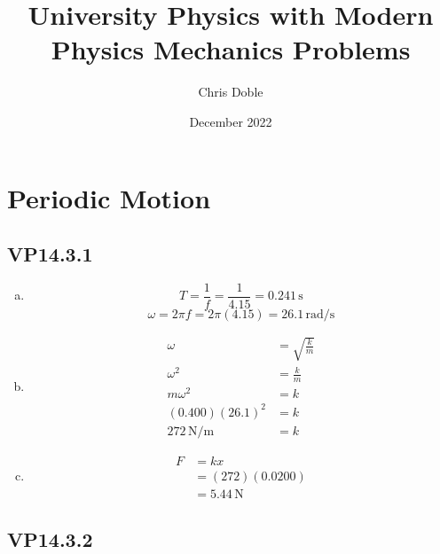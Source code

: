 \documentclass{article}
\title{University Physics with Modern Physics Mechanics Problems}
\author{Chris Doble}
\date{December 2022}
\begin{document}
\maketitle

\tableofcontents

\setcounter{section}{13}
\section{Periodic Motion}

\subsection{VP14.3.1}

\begin{enumerate}[a)]
  \item
        \[T = \frac{1}{f} = \frac{1}{4.15} = 0.241\,\textrm{s}\]
        \[\omega = 2\pi f = 2\pi(4.15) = 26.1\,\textrm{rad/s}\]

  \item
        \begin{align*}
          \omega            & = \sqrt{\frac{k}{m}} \\
          \omega^2          & = \frac{k}{m}        \\
          m\omega^2         & = k                  \\
          (0.400)(26.1)^2   & = k                  \\
          272\,\textrm{N/m} & = k
        \end{align*}

  \item
        \begin{align*}
          F & = kx               \\
            & = (272)(0.0200)    \\
            & = 5.44\,\textrm{N}
        \end{align*}
\end{enumerate}

\subsection{VP14.3.2}
\end{document}
